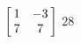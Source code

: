{$\left[\hskip -3pt \begin{array}{cc} 1&-3\\  7&7\end {array} \hskip -3pt
 \right]$} 
{$28$}



  

